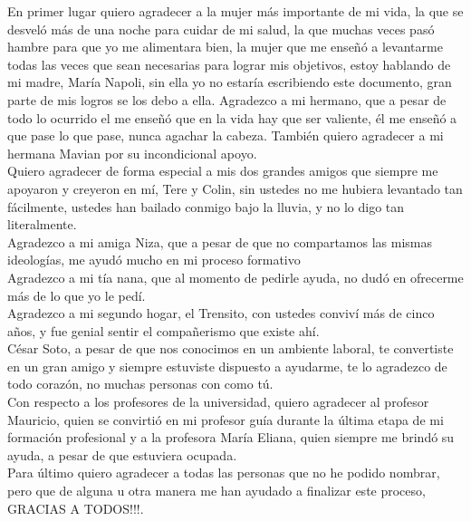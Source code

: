 En primer lugar quiero agradecer a la mujer más importante de mi  vida,  la que se desveló más de una noche  para cuidar de mi salud, la que muchas veces pasó hambre para que yo me alimentara bien, la mujer que me enseñó a levantarme todas las veces que sean necesarias para lograr mis objetivos, estoy hablando de mi madre, María Napoli, sin ella yo no  estaría escribiendo este documento, gran parte de mis logros se los debo a ella. Agradezco a mi hermano,  que a pesar de todo lo ocurrido el me enseñó que en la vida hay que ser valiente, él me enseñó a que pase lo que pase, nunca agachar la cabeza. También quiero agradecer a mi hermana Mavian por su incondicional apoyo.
\\

Quiero agradecer de forma especial a mis dos grandes amigos que siempre me apoyaron y creyeron en mí, Tere y Colin, sin ustedes  no me hubiera levantado tan fácilmente, ustedes han  bailado conmigo bajo la lluvia, y no lo digo tan literalmente.\\

Agradezco a mi amiga Niza, que a pesar de que no compartamos las mismas ideologías, me ayudó mucho en mi proceso formativo \\

Agradezco a mi tía nana, que al momento de pedirle ayuda, no dudó en ofrecerme más de lo que yo le pedí.\\

Agradezco a mi segundo hogar, el Trensito,  con ustedes conviví más de cinco años, y fue genial sentir el compañerismo que existe ahí.
\\

César Soto, a pesar de que nos conocimos en un ambiente laboral, te convertiste en un gran amigo y siempre estuviste dispuesto a ayudarme, te lo agradezco de todo corazón, no muchas personas con como tú.\\



Con respecto a los profesores de la universidad, quiero agradecer al profesor Mauricio, quien se convirtió en mi profesor guía durante la última etapa de mi formación profesional y a la profesora María Eliana, quien siempre me brindó su ayuda, a pesar de que estuviera ocupada. 
 \\

 
Para último quiero agradecer a todas las personas que no he podido nombrar, pero que de alguna u otra  manera me han ayudado  a finalizar este proceso, GRACIAS A TODOS!!!.


 
 
 
 
 